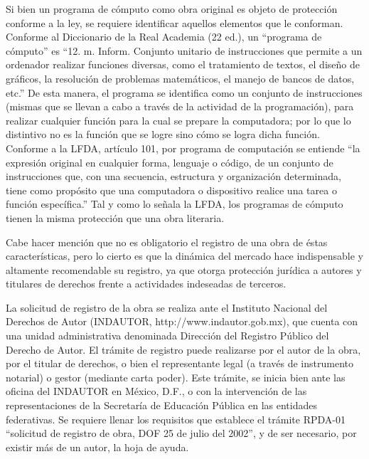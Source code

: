 \documentclass[12pt, fleqn]{report}                             %
\theoremstyle{break}                                            %
\begin{document}
    Si bien un programa de cómputo como obra original es objeto de protección conforme a la ley, se requiere identificar aquellos elementos que le conforman.  Conforme al Diccionario de la Real Academia (22 ed.), un “programa de cómputo” es “12. m. Inform. Conjunto unitario de instrucciones que permite a un ordenador realizar funciones diversas, como el tratamiento de textos, el diseño de gráficos, la resolución de problemas matemáticos, el manejo de bancos de datos, etc.”  De esta manera, el programa se identifica como un conjunto de instrucciones (mismas que se llevan a cabo a través de la actividad de la programación), para realizar cualquier función para la cual se prepare la computadora;  por lo que lo distintivo no es la función que se logre sino cómo se logra dicha función.  Conforme a la LFDA, artículo 101, por programa de computación se entiende “la expresión original en cualquier forma, lenguaje o código, de un conjunto de instrucciones que, con una secuencia, estructura y organización determinada, tiene como propósito que una computadora  o dispositivo realice una tarea o función específica.”  Tal y como lo señala la LFDA, los programas de cómputo tienen la misma protección que una obra literaria.

    Cabe hacer mención que no es obligatorio el registro de una obra de éstas características, pero lo cierto es que la dinámica del mercado hace indispensable y altamente recomendable su registro, ya que otorga protección jurídica a autores y titulares de derechos frente a actividades indeseadas de terceros.

    La solicitud de registro de la obra se realiza ante el Instituto Nacional del Derechos de Autor (INDAUTOR, http://www.indautor.gob.mx), que cuenta con una unidad administrativa denominada Dirección del Registro Público del Derecho de Autor.  El trámite de registro puede realizarse por el autor de la obra, por el titular de derechos, o bien el representante legal (a través de instrumento notarial) o gestor (mediante carta poder).  Este trámite, se inicia bien ante las oficina del INDAUTOR en México, D.F., o con la intervención de las representaciones de la Secretaría de Educación Pública en las entidades federativas.  Se requiere llenar los requisitos que establece el trámite RPDA-01 “solicitud de registro de obra, DOF 25 de julio del 2002”, y de ser necesario, por existir más de un autor, la hoja de ayuda.
\end{document}
